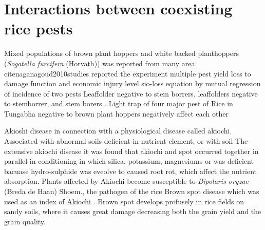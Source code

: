 \section*{Interactions between coexisting rice pests}

Mixed populations of brown plant hoppers and white backed planthoppers (\textit{Sogatella furcifera} (Horvath)) was reported from many area. cite{naganagoud2010studies} reported the experiment multiple pest yield loss to damage function and economic injury level sio-loss equation by mutual regression of incidence of two pests Leaffolder negative to stem borrers, leaffolders negative to stemborrer, and stem borers \cite{selvaraj2012determination}. Light trap of four major pest of Rice in Tungabha negative to brown plant hoppers negatively affect each other\

Akioshi disease in connection with a physiological disease called akiochi.  Associated with abnormal soils deficient in nutrient element, or with soil  The extensive akiochi disease it was found that akiochi and spot occurred together in parallel in conditioning in which silica, potassium, magnesiums or  was deficient bacuase hydro-sulphide was eveolve to caused root rot, which affect the nutrient absorption. Plants affected by Akiochi become susceptible to \textit{Bipolaris oryzae} (Breda de Haan) Shoem., the pathogen of the rice Brown spot disease which was used as an index of Akiochi \cite{ouricedisease}. Brown spot develops profusely in rice fields on sandy soils, where it causes great damage decreasing both the grain yield and the grain quality.


